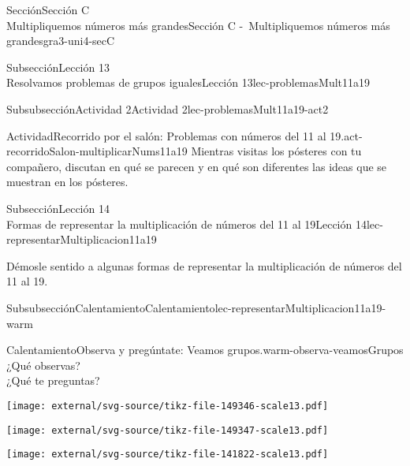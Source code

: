 \begin{sectionptx}{Sección}{{\Large Sección C\\}Multipliquemos números más grandes}{}{Sección C -~Multipliquemos números más grandes}{}{}{gra3-uni4-secC}
\begin{subsectionptx}{Subsección}{{\normalsize Lección 13\\[-0.05cm]}Resolvamos problemas de grupos iguales}{}{Lección 13}{}{}{lec-problemasMult11a19}
\begin{subsubsectionptx}{Subsubsección}{Actividad 2}{}{Actividad 2}{}{}{lec-problemasMult11a19-act2}
\begin{activity}{Actividad}{Recorrido por el salón: Problemas con números del 11 al 19.}{act-recorridoSalon-multiplicarNums11a19}
Mientras visitas los pósteres con tu compañero, discutan en qué se parecen y en qué son diferentes las ideas que se muestran en los pósteres.%
\end{activity}%
\end{subsubsectionptx}
\end{subsectionptx}
%
%
\typeout{************************************************}
\typeout{************************************************}
%
\begin{subsectionptx}{Subsección}{{\normalsize Lección 14\\[-0.05cm]}Formas de representar la multiplicación de números del 11 al 19}{}{Lección 14}{}{}{lec-representarMultiplicacion11a19}
\begin{introduction}{}%
Démosle sentido a algunas formas de representar la multiplicación de números del 11 al 19.%
\end{introduction}%
%
%
\typeout{************************************************}
\typeout{************************************************}
%
\begin{subsubsectionptx}{Subsubsección}{Calentamiento}{}{Calentamiento}{}{}{lec-representarMultiplicacion11a19-warm}
\begin{exploration}{Calentamiento}{Observa y pregúntate: Veamos grupos.}{warm-observa-veamosGrupos}%
¿Qué observas?\\
 ¿Qué te preguntas?%
\begin{sidebyside}{3}{0}{0}{0}%
\begin{sbspanel}{0.333333333333333}%
\texttt{[image: external/svg-source/tikz-file-149346-scale13.pdf]}
\end{sbspanel}%
\begin{sbspanel}{0.333333333333333}%
\texttt{[image: external/svg-source/tikz-file-149347-scale13.pdf]}
\end{sbspanel}%
\begin{sbspanel}{0.333333333333333}%
\texttt{[image: external/svg-source/tikz-file-141822-scale13.pdf]}
\end{sbspanel}%
\end{sidebyside}%
\end{exploration}%
\end{subsubsectionptx}
%
%
\typeout{************************************************}

\end{subsectionptx}
\end{sectionptx}
